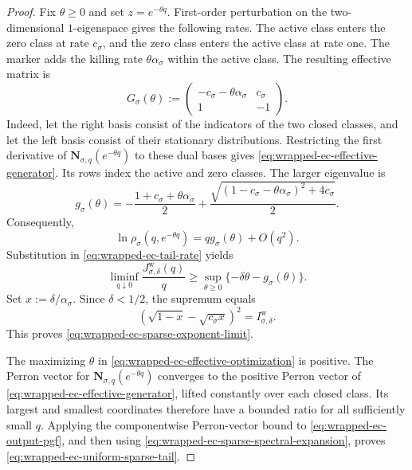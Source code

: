 \begin{proof}
Fix $\theta\geq0$ and set $z=e^{-\theta q}$.  First-order perturbation on the
two-dimensional $1$-eigenspace gives the following rates.  The active class
enters the zero class at rate $c_\sigma$, and the zero class enters the active
class at rate one.  The marker adds the killing rate
$\theta\alpha_\sigma$ within the active class.  The resulting effective matrix
is
\begin{equation}
 G_\sigma(\theta):=
 \begin{pmatrix}
  -c_\sigma-\theta\alpha_\sigma & c_\sigma\\
  1 & -1
 \end{pmatrix}.
 \label{eq:wrapped-ec-effective-generator}
\end{equation}
Indeed, let the right basis consist of the indicators of the two closed
classes, and let the left basis consist of their stationary distributions.
Restricting the first derivative of
$\mathbf N_{\sigma,q}(e^{-\theta q})$ to these dual bases gives
\eqref{eq:wrapped-ec-effective-generator}.
Its rows index the active and zero classes.  The larger eigenvalue is
\begin{equation}
 g_\sigma(\theta)
 =-\frac{1+c_\sigma+\theta\alpha_\sigma}{2}
 +\frac{
  \sqrt{(1-c_\sigma-\theta\alpha_\sigma)^2+4c_\sigma}
 }{2}.
 \label{eq:wrapped-ec-effective-eigenvalue}
\end{equation}
Consequently,
\begin{equation}
 \ln\rho_\sigma(q,e^{-\theta q})
 =qg_\sigma(\theta)+O(q^2).
 \label{eq:wrapped-ec-sparse-spectral-expansion}
\end{equation}
Substitution in \eqref{eq:wrapped-ec-tail-rate} yields
\begin{equation}
 \liminf_{q\downarrow0}
 \frac{J^{\mathrm{w}}_{\sigma,\delta}(q)}{q}
 \geq
 \sup_{\theta\geq0}
 \{-\delta\theta-g_\sigma(\theta)\}.
 \label{eq:wrapped-ec-effective-optimization}
\end{equation}
Set $x:=\delta/\alpha_\sigma$.  Since $\delta<1/2$, the supremum equals
\begin{equation}
 \left(\sqrt{1-x}-\sqrt{c_\sigma x}\right)^2
 =I^{\mathrm{w}}_{\sigma,\delta}.
 \label{eq:wrapped-ec-effective-rate}
\end{equation}
This proves \eqref{eq:wrapped-ec-sparse-exponent-limit}.

The maximizing $\theta$ in \eqref{eq:wrapped-ec-effective-optimization} is
positive.  The Perron vector for
$\mathbf N_{\sigma,q}(e^{-\theta q})$ converges to the positive Perron vector
of \eqref{eq:wrapped-ec-effective-generator}, lifted constantly over each
closed class.  Its largest and smallest coordinates therefore have a bounded
ratio for all sufficiently small $q$.  Applying the componentwise
Perron-vector bound to \eqref{eq:wrapped-ec-output-pgf}, and then using
\eqref{eq:wrapped-ec-sparse-spectral-expansion}, proves
\eqref{eq:wrapped-ec-uniform-sparse-tail}.


\end{proof}
